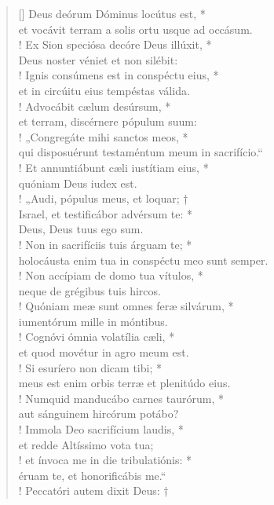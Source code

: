 \begin{verse}[\versewidth]
Deus deórum Dóminus locútus est, *\\
et vocávit terram a solis ortu usque ad occásum.\\!
\vin Ex Sion speciósa decóre Deus illúxit, *\\
\vin Deus noster véniet et non silébit:\\!
Ignis consúmens est in conspéctu eius, *\\
et in circúitu eius tempéstas válida.\\!
\vin Advocábit cælum desúrsum, *\\
\vin et terram, discérnere pópulum suum:\\!
„Congregáte mihi sanctos meos, *\\
qui disposuérunt testaméntum meum in sacrifício.“\\!
\vin Et annuntiábunt cæli iustítiam eius, *\\
\vin quóniam Deus iudex est.\\!
„Audi, pópulus meus, et loquar; †\\
Israel, et testificábor advérsum te: *\\
Deus, Deus tuus ego sum.\\!
\vin Non in sacrifíciis tuis árguam te; *\\
\vin holocáusta enim tua in conspéctu meo sunt semper.\\!
Non accípiam de domo tua vítulos, *\\
neque de grégibus tuis hircos.\\!
\vin Quóniam meæ sunt omnes feræ silvárum, *\\
\vin iumentórum mille in móntibus.\\!
Cognóvi ómnia volatília cæli, *\\
et quod movétur in agro meum est.\\!
\vin Si esuríero non dicam tibi; *\\
\vin meus est enim orbis terræ et plenitúdo eius.\\!
Numquid manducábo carnes taurórum, *\\
aut sánguinem hircórum potábo?\\!
\vin Immola Deo sacrifícium laudis, *\\
\vin et redde Altíssimo vota tua;\\!
et ínvoca me in die tribulatiónis: *\\
éruam te, et honorificábis me.“\\!
\vin Peccatóri autem dixit Deus: †\\

\end{verse}
